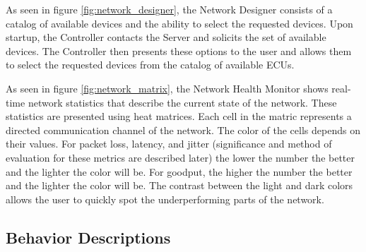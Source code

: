\documentclass[letterpaper,twocolumn,12pt]{article}
\begin{document}
As seen in figure \ref{fig:network_designer}, the Network Designer consists of a catalog of available devices and the ability to select the requested devices. Upon startup, the Controller contacts the Server and solicits the set of available devices. The Controller then presents these options to the user and allows them to select the requested devices from the catalog of available ECUs.


As seen in figure \ref{fig:network_matrix}, the Network Health Monitor shows real-time network statistics that describe the current state of the network. These statistics are presented using heat matrices. Each cell in the matric represents a directed communication channel of the network. The color of the cells depends on their values. For packet loss, latency, and jitter (significance and method of evaluation for these metrics are described later) the lower the number the better and the lighter the color will be. For goodput, the higher the number the better and the lighter the color will be. The contrast between the light and dark colors allows the user to quickly spot the underperforming parts of the network.

\subsection{Behavior Descriptions}
\end{document}
